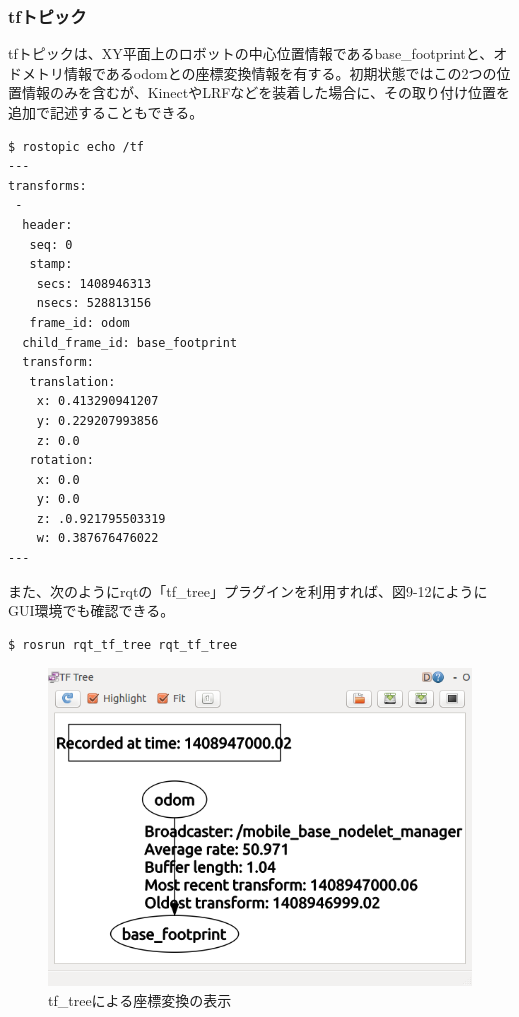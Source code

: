 \begin{itemize}
\subsubsection{tfトピック}

tfトピックは、XY平面上のロボットの中心位置情報であるbase\_footprintと、オドメトリ情報であるodomとの座標変換情報を有する。初期状態ではこの2つの位置情報のみを含むが、KinectやLRFなどを装着した場合に、その取り付け位置を追加で記述することもできる。

\begin{lstlisting}[language=ROS]
$ rostopic echo /tf
---
transforms:
 -
  header:
   seq: 0
   stamp:
    secs: 1408946313
    nsecs: 528813156
   frame_id: odom
  child_frame_id: base_footprint
  transform:
   translation:
    x: 0.413290941207
    y: 0.229207993856
    z: 0.0
   rotation:
    x: 0.0
    y: 0.0
    z: .0.921795503319
    w: 0.387676476022
---
\end{lstlisting}

また、次のようにrqtの「tf\_tree」プラグインを利用すれば、図9-12にようにGUI環境でも確認できる。

\begin{lstlisting}[language=ROS]
$ rosrun rqt_tf_tree rqt_tf_tree
\end{lstlisting}

\begin{figure}[ht]
  \centering
  \includegraphics[width=\columnwidth]{pictures/chapter9/pic_09_12.png}
  \caption{tf\_treeによる座標変換の表示}
\end{figure}



\end{itemize}
